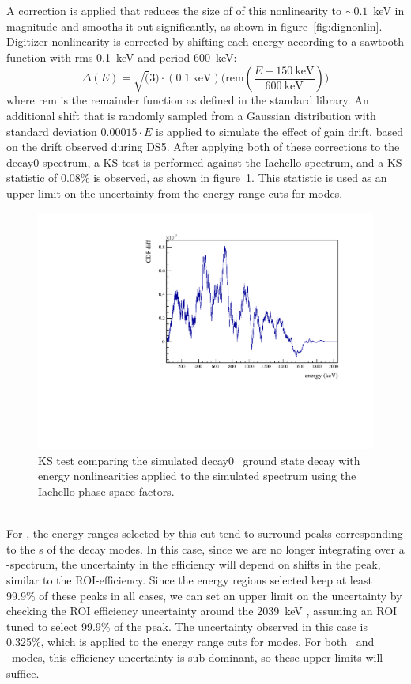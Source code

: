 \documentclass[/main.tex]{subfiles}
\begin{document}
A correction is applied that reduces the size of of this nonlinearity to $\sim0.1$~keV in magnitude and smooths it out significantly, as shown in figure~\ref{fig:dignonlin}.
Digitizer nonlinearity is corrected by shifting each energy according to a sawtooth function with rms 0.1~keV and period 600~keV:
\begin{equation}
  \Delta(E) = \sqrt(3)\cdot (0.1~\mathrm{keV}) \big(\mathrm{rem}(\frac{E-150~\mathrm{keV}}{600~\mathrm{keV}}) \big)
\end{equation}
where $\mathrm{rem}$ is the remainder function as defined in the \cpp standard library.
An additional shift that is randomly sampled from a Gaussian distribution with standard deviation $0.00015\cdot E$ is applied to simulate the effect of gain drift, based on the drift observed during DS5.
After applying both of these corrections to the decay0 spectrum, a KS test is performed against the Iachello spectrum, and a KS statistic of 0.08\% is observed, as shown in figure~\ref{fig:decay0NLCks}.
This statistic is used as an upper limit on the uncertainty from the energy range cuts for \tnbb modes.
\begin{figure}[h]
  \centering
  \includegraphics[width=0.6\linewidth]{decay0KS}
  \caption[KS Test of decay0 spectrum with energy non-linearities vs Iachello spectrum]{\label{fig:decay0NLCks}
    KS test comparing the simulated decay0 \tnbb\ ground state decay with energy nonlinearities applied to the simulated spectrum using the Iachello phase space factors.
  }
\end{figure}
\\
For \znbb, the energy ranges selected by this cut tend to surround peaks corresponding to the \Qbb s of the decay modes.
In this case, since we are no longer integrating over a \bb -spectrum, the uncertainty in the efficiency will depend on shifts in the peak, similar to the ROI-efficiency.
Since the energy regions selected keep at least 99.9\% of these peaks in all cases, we can set an upper limit on the uncertainty by checking the ROI efficiency uncertainty around the 2039~keV \Qbb, assuming an ROI tuned to select 99.9\% of the peak.
The uncertainty observed in this case is 0.325\%, which is applied to the energy range cuts for \znbb modes.
For both \znbb\ and \tnbb\ modes, this efficiency uncertainty is sub-dominant, so these upper limits will suffice.
\\
\end{document}

